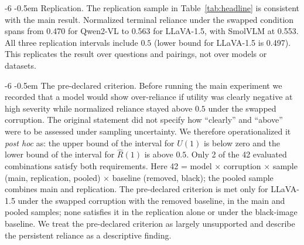 \documentclass[graybox]{svmult}
\makeatletter
\newcommand{\checknum}[2]{#1}
\renewcommand\paragraph{\@startsection{paragraph}{4}{\z@}%
  {-6\p@ \@plus -2\p@ \@minus -2\p@}%
  {-0.5em}%
  {\normalfont\normalsize\bfseries}}
\makeatother
\begin{document}
\paragraph{Replication.}
The replication sample in Table~\ref{tab:headline} is consistent with the main result.
Normalized terminal reliance under the swapped condition spans from
\checknum{0.470}{rep:Qwen:swapblend:R_hat_1} for Qwen2-VL to
\checknum{0.563}{rep:llava:swapblend:R_hat_1} for LLaVA-1.5, with SmolVLM at
\checknum{0.553}{rep:SmolVLM:swapblend:R_hat_1}. All three replication
intervals include $0.5$ (lower bound for LLaVA-1.5 is
\checknum{0.497}{rep:llava:swapblend:R_hat_1_ci_lo}).
This replicates the result over questions and pairings, not over models or
datasets.

\paragraph{The pre-declared criterion.}
Before running the main experiment we recorded that a model would show
over-reliance if utility was clearly negative at high severity while
normalized reliance stayed above $0.5$ under the swapped corruption. The
original statement did not specify how ``clearly'' and ``above'' were to
be assessed under sampling uncertainty. We therefore operationalized it
\emph{post hoc} as: the upper bound of the interval for $U(1)$ is below
zero and the lower bound of the interval for $\hat R(1)$ is above $0.5$.
Only \checknum{2}{criterion:status:count_met} of the 42
evaluated combinations satisfy both requirements. Here 42 = model $\times$ corruption $\times$ sample (main, replication, pooled) $\times$ baseline (removed, black); the pooled sample combines main and replication.
The pre-declared criterion is met only for LLaVA-1.5 under the swapped
corruption with the removed baseline, in the main and pooled samples;
none satisfies it in the replication alone or under the black-image baseline.
We treat the pre-declared criterion as largely unsupported and describe
the persistent reliance as a descriptive finding.
\end{document}
